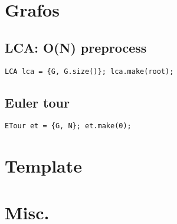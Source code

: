\section{Grafos}
    \subsection{LCA: O(N) preprocess}
        \texttt{LCA lca = \{G, G.size()\}; lca.make(root);}
    \subsection{Euler tour}
        \texttt{ETour et = \{G, N\}; et.make(0);}

\section{Template}

\section{Misc.}
    


